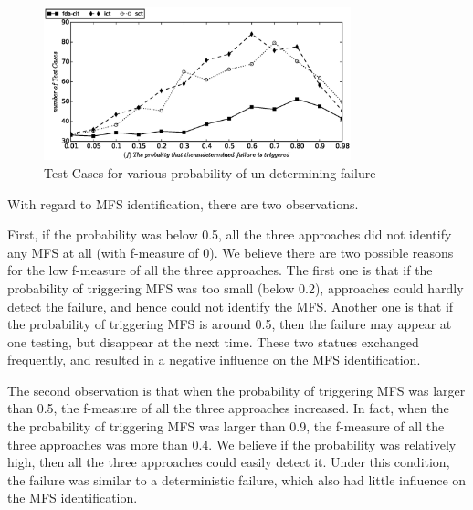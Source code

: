 \documentclass[10pt,journal,compsoc]{IEEEtran}
\begin{document}
\begin{figure}[htbp]
 \includegraphics[width=3.5in]{sen_und_tests.eps}
\caption{Test Cases for various probability of un-determining failure}
\label{sen_und_tests_result}
\end{figure}

With regard to MFS identification, there are two observations. {\color{blue}First, if the probability was below 0.5, all the three approaches did  not identify any MFS at all (with f-measure of 0). We believe there are two possible reasons for the low f-measure of all the three approaches. The first one is that if the probability of triggering MFS was too small (below 0.2), approaches could hardly detect the failure, and hence could not identify the MFS. Another one is that if the probability of triggering MFS is around 0.5, then the failure may appear at one testing, but disappear at the next time. These two statues exchanged frequently, and resulted in a negative influence on the MFS identification.


The second observation is that when the probability of triggering MFS was larger than 0.5, the f-measure of all the three approaches increased. In fact, when the the probability of triggering MFS was larger than 0.9,  the f-measure of all the three approaches was more than 0.4. We believe if the probability was relatively high, then all the three approaches could easily detect it. Under this condition, the failure was similar to a deterministic failure, which also had little influence on the MFS identification. }
\end{document}
